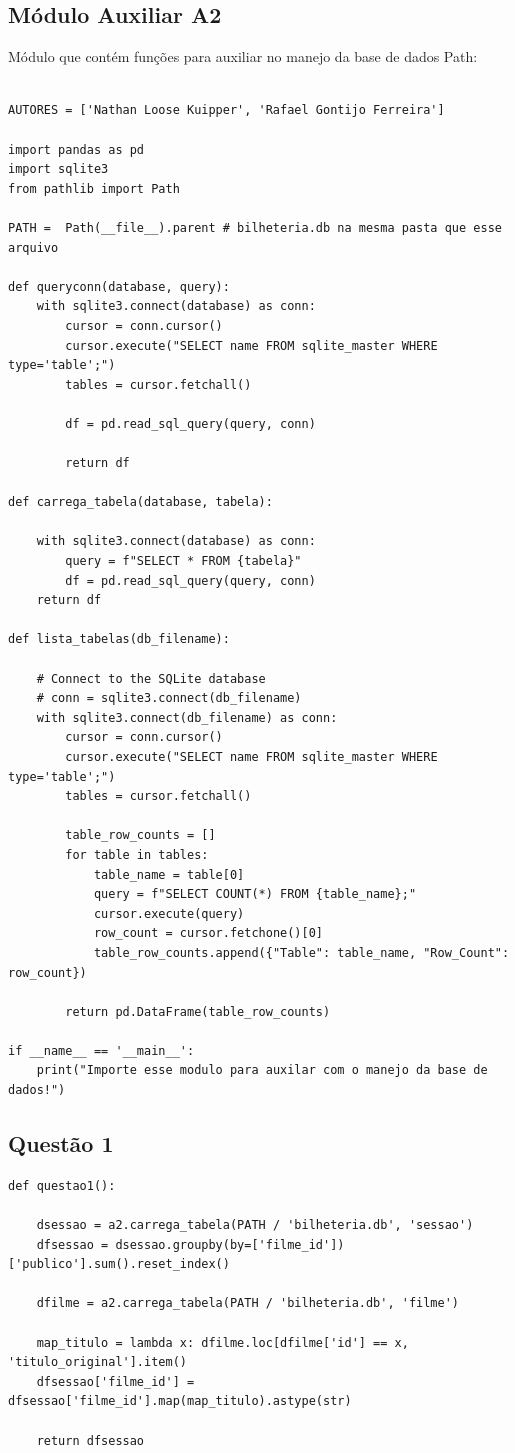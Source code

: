 \documentclass{article}
\begin{document}
\subsection*{Módulo Auxiliar A2}
Módulo que contém funções para auxiliar no manejo da base de dados
Path:
\begin{lstlisting}

AUTORES = ['Nathan Loose Kuipper', 'Rafael Gontijo Ferreira']

import pandas as pd 
import sqlite3
from pathlib import Path

PATH =  Path(__file__).parent # bilheteria.db na mesma pasta que esse arquivo

def queryconn(database, query):
    with sqlite3.connect(database) as conn:
        cursor = conn.cursor()
        cursor.execute("SELECT name FROM sqlite_master WHERE type='table';")
        tables = cursor.fetchall()

        df = pd.read_sql_query(query, conn)
        
        return df
    
def carrega_tabela(database, tabela):

    with sqlite3.connect(database) as conn:
        query = f"SELECT * FROM {tabela}"
        df = pd.read_sql_query(query, conn)
    return df

def lista_tabelas(db_filename):

    # Connect to the SQLite database
    # conn = sqlite3.connect(db_filename)
    with sqlite3.connect(db_filename) as conn:
        cursor = conn.cursor()
        cursor.execute("SELECT name FROM sqlite_master WHERE type='table';")
        tables = cursor.fetchall()

        table_row_counts = []
        for table in tables:
            table_name = table[0]
            query = f"SELECT COUNT(*) FROM {table_name};"
            cursor.execute(query)
            row_count = cursor.fetchone()[0]
            table_row_counts.append({"Table": table_name, "Row_Count": row_count})

        return pd.DataFrame(table_row_counts)
    
if __name__ == '__main__':
    print("Importe esse modulo para auxilar com o manejo da base de dados!")
\end{lstlisting}
\subsection*{Questão 1}
\begin{lstlisting}
def questao1():
    
    dsessao = a2.carrega_tabela(PATH / 'bilheteria.db', 'sessao')
    dfsessao = dsessao.groupby(by=['filme_id'])['publico'].sum().reset_index()

    dfilme = a2.carrega_tabela(PATH / 'bilheteria.db', 'filme')
    
    map_titulo = lambda x: dfilme.loc[dfilme['id'] == x, 'titulo_original'].item()
    dfsessao['filme_id'] =  dfsessao['filme_id'].map(map_titulo).astype(str)
    
    return dfsessao
\end{lstlisting}
\end{document}
